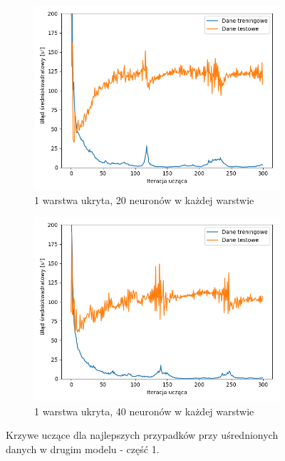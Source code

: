 \documentclass[12pt]{aghdpl}
\begin{document}
		\begin{figure}[h]
			\centering
			\begin{subfigure}{.8\linewidth}
		 		\includegraphics[width =\linewidth]{wykresy/5_usrednianie_danych/1_warstwa_20_neuronow_wykres_uczenia.png}
		 		\caption{1 warstwa ukryta, 20 neuronów w każdej warstwie}
		 	\end{subfigure}
		 	\begin{subfigure}{.8\linewidth}
		 		\includegraphics[width =\linewidth]{wykresy/5_usrednianie_danych/1_warstwa_40_neuronow_wykres_uczenia.png}
		 		\caption{1 warstwa ukryta, 40 neuronów w każdej warstwie}
		 	\end{subfigure}
		 
		 	\caption{Krzywe uczące dla najlepszych przypadków przy uśrednionych danych w drugim modelu - część 1.}
			\label{fig: drugi_model_przy_usrednionych_danych_wykresy_uczenia_1}
		\end{figure}
		 	
\end{document}
